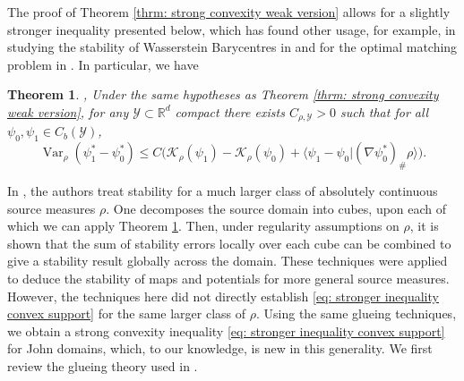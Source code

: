 \documentclass[11pt, oneside, titlepage]{book}
\theoremstyle{plain}
\newtheorem{theorem}{Theorem}[chapter]
\theoremstyle{definition}
\newcommand{\R}{\mathbb{R}}
\newcommand{\K}{\mathcal{K}}
\newcommand{\Y}{\mathcal{Y}}
\DeclareMathOperator{\var}{Var}
\begin{document}
The proof of Theorem \ref{thrm: strong convexity weak version} allows for a slightly stronger inequality presented below, which has found other usage, for example, in studying the stability of Wasserstein Barycentres in \cite{carlier2024barycentres} and for the optimal matching problem in \cite{huesmann2024asymptotics}. In particular, we have
\begin{theorem}\textnormal{\cite[Appendix B]{carlier2024barycentres}, \cite{delalande2023quantitative}}
\label{theorem: strong convexity convex support}
    Under the same hypotheses as Theorem \ref{thrm: strong convexity weak version}, for any $\Y \subset \R^d$ compact there exists $C_{\rho, \Y} >0$ such that for all $\psi_0, \psi_1 \in C_b(\Y)$,
\begin{equation}
    \label{eq: stronger inequality convex support}
    \var_\rho(\psi_1^* - \psi_0^*) \leq C \bigg(\K_\rho(\psi_1) -\K_\rho(\psi_0) + \langle \psi_1 - \psi_0 | (\nabla\psi_0^*)_\# \rho \rangle \bigg).
\end{equation}

\end{theorem}
In \cite{letrouit2024gluing, kitagawa2025stability}, the authors treat stability for a much larger class of absolutely continuous source measures $\rho$. One decomposes the source domain into cubes, upon each of which we can apply Theorem \ref{theorem: strong convexity convex support}. Then, under regularity assumptions on $\rho$, it is shown that the sum of stability errors locally over each cube can be combined to give a stability result globally across the domain. These techniques were applied to deduce the stability of maps and potentials for more general source measures. However, the techniques here did not directly establish \eqref{eq: stronger inequality convex support} for the same larger class of $\rho$. Using the same glueing techniques, we obtain a strong convexity inequality \eqref{eq: stronger inequality convex support} for John domains, which, to our knowledge, is new in this generality. We first review the glueing theory used in \cite{letrouit2024gluing}.
\end{document}
